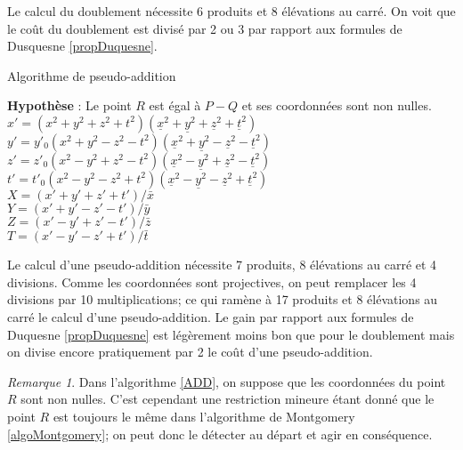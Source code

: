 \documentclass[a4paper]{article}
\theoremstyle{definition}
\theoremstyle{remark}
\newtheorem{remarque}{Remarque}
\numberwithin{equation}{section}
\begin{document}
Le calcul du doublement nécessite 6 produits et 8 élévations au carré. On voit que le coût du doublement est divisé par 2 ou 3 par rapport aux formules de Dusquesne \ref{propDuquesne}.

\begin{algorithm}
\label{ADD}
\caption{Algorithme de pseudo-addition}
\textbf{Hypothèse} : Le point $R$ est égal à $P-Q$ et ses coordonnées sont non nulles. \\
$x' = (x^2 + y^2 + z^2 + t^2)(\underline{x}^2 + \underline{y}^2 + \underline{z}^2 + \underline{t}^2)$ \\
$y' = y'_0(x^2 + y^2 - z^2 - t^2)(\underline{x}^2 + \underline{y}^2 - \underline{z}^2 - \underline{t}^2)$ \\
$z' = z'_0(x^2 - y^2 + z^2 - t^2)(\underline{x}^2 - \underline{y}^2 + \underline{z}^2 - \underline{t}^2)$ \\
$t' = t'_0(x^2 - y^2 - z^2 + t^2)(\underline{x}^2 - \underline{y}^2 - \underline{z}^2 + \underline{t}^2)$ \\
$X = (x' + y' + z' + t')/\bar{x}$ \\
$Y = (x' + y' - z' - t')/\bar{y}$ \\
$Z = (x' - y' + z' - t')/\bar{z}$ \\
$T = (x' - y' - z' + t')/\bar{t}$ \\
\end{algorithm}

Le calcul d'une pseudo-addition nécessite 7 produits, 8 élévations au carré et 4 divisions. Comme les coordonnées sont projectives, on peut remplacer les 4 divisions par 10 multiplications; ce qui ramène à 17 produits et 8 élévations au carré le calcul d'une pseudo-addition. Le gain par rapport aux formules de Duquesne \ref{propDuquesne} est légèrement moins bon que pour le doublement mais on divise encore pratiquement par 2 le coût d'une pseudo-addition.

\begin{remarque}
Dans l'algorithme \ref{ADD}, on suppose que les coordonnées du point $R$ sont non nulles. C'est cependant une restriction mineure étant donné que le point $R$ est toujours le même dans l'algorithme de Montgomery \ref{algoMontgomery}; on peut donc le détecter au départ et agir en conséquence.
\end{remarque}
\end{document}
